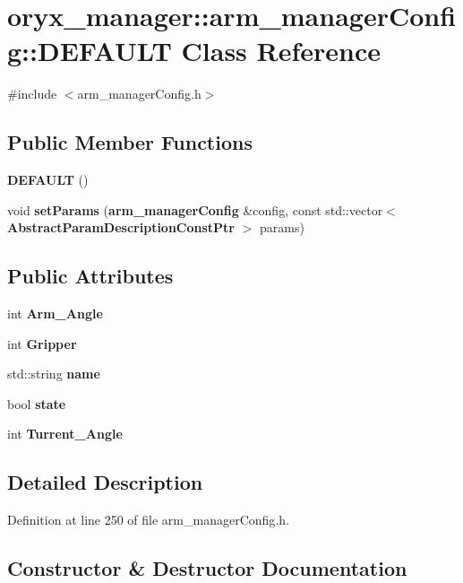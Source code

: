 \section{oryx\-\_\-manager\-:\-:arm\-\_\-manager\-Config\-:\-:\-D\-E\-F\-A\-U\-L\-T \-Class \-Reference}
\label{classoryx__manager_1_1arm__managerConfig_1_1DEFAULT}


{\ttfamily \#include $<$arm\-\_\-manager\-Config.\-h$>$}

\subsection*{\-Public \-Member \-Functions}
\begin{DoxyCompactItemize}
\item 
{\bf \-D\-E\-F\-A\-U\-L\-T} ()
\item 
void {\bf set\-Params} ({\bf arm\-\_\-manager\-Config} \&config, const std\-::vector$<$ {\bf \-Abstract\-Param\-Description\-Const\-Ptr} $>$ params)
\end{DoxyCompactItemize}
\subsection*{\-Public \-Attributes}
\begin{DoxyCompactItemize}
\item 
int {\bf \-Arm\-\_\-\-Angle}
\item 
int {\bf \-Gripper}
\item 
std\-::string {\bf name}
\item 
bool {\bf state}
\item 
int {\bf \-Turrent\-\_\-\-Angle}
\end{DoxyCompactItemize}


\subsection{\-Detailed \-Description}


\-Definition at line 250 of file arm\-\_\-manager\-Config.\-h.



\subsection{\-Constructor \& \-Destructor \-Documentation}
